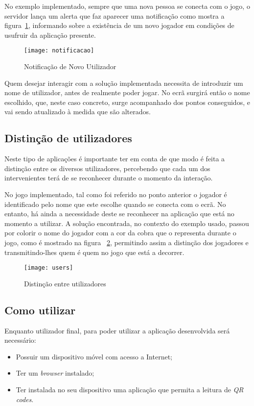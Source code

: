 	No exemplo implementado, sempre que uma nova pessoa se conecta com o jogo, o servidor lança um alerta que faz aparecer uma notificação como mostra a figura~\ref{fig:novo}, informando sobre a existência de um novo jogador em condições de usufruir da aplicação presente.

	\begin{figure}[ht]
		\centering
		\texttt{[image: notificacao]}
		\caption[Novo Utilizador] {Notificação de Novo Utilizador}
		\label{fig:novo}
	\end{figure}

	Quem desejar interagir com a solução implementada necessita de introduzir um nome de utilizador, antes de realmente poder jogar. No ecrã surgirá então o nome escolhido, que, neste caso concreto, surge acompanhado dos pontos conseguidos, e vai sendo atualizado à medida que são alterados.


	\subsection{Distinção de utilizadores}

	Neste tipo de aplicações é importante ter em conta de que modo é feita a distinção entre os diversos utilizadores, percebendo que cada um dos intervenientes terá de se reconhecer durante o momento da interação.

	No jogo implementado, tal como foi referido no ponto anterior o jogador é identificado pelo nome que este escolhe quando se conecta com o ecrã. No entanto, há ainda a necessidade deste se reconhecer na aplicação que está no momento a utilizar. A solução encontrada, no contexto do exemplo usado, passou por colorir o nome do jogador com a cor da cobra que o representa durante o jogo, como é mostrado na figura ~\ref{fig:user}, permitindo assim a distinção dos jogadores e transmitindo-lhes quem é quem no jogo que está a decorrer.

	\begin{figure}[ht]
		\centering
		\texttt{[image: users]}
		\caption[Distinção de Utilizadores]{Distinção entre utilizadores}
		\label{fig:user}
	\end{figure}

	\subsection{Como utilizar}

	Enquanto utilizador final, para poder utilizar a aplicação desenvolvida será necessário:
	\begin{itemize}
		\item Possuir um dispositivo móvel com acesso a Internet;
		\item Ter um \textit{browser} instalado;
		\item Ter instalada no seu dispositivo uma aplicação que permita a leitura de \textit{QR codes}.
	\end{itemize}

